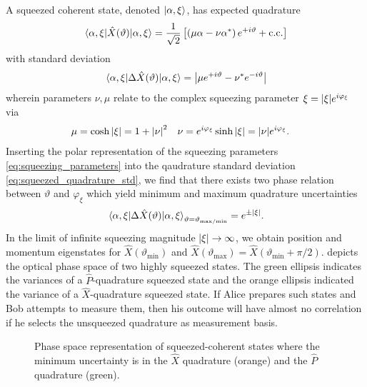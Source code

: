 A squeezed coherent state, denoted $\ket{\alpha,\xi}$, has expected quadrature~\cite[p.~91,94]{Vogel2006}
\begin{equation}
	\expval{\hat{X}(\vartheta)}{\alpha,\xi}
	=
	\frac{1}{\sqrt{2}}
	\left[
		\left(\mu\alpha-\nu\alpha^*\right)
		e^{+i\vartheta}
		+
		\text{c.c.}
	\right]
\end{equation}
with standard deviation~\cite[p.~95]{Vogel2006}
\begin{equation}
	\expval{\Delta\hat{X}(\vartheta)}{\alpha,\xi}
	=
	\abs{\mu e^{+i\vartheta}-\nu^* e^{-i\vartheta}}
	\label{eq:squeezed_quadrature_std}
\end{equation}
wherein parameters $\nu,\mu$ relate to the complex squeezing parameter $\xi=\abs{\xi}e^{i\varphi_\xi}$ via~\cite[p.~90]{Vogel2006}
\begin{align}
	\mu
	&=
	\cosh\abs{\xi}
	=
	1+\abs{\nu}^2
	&
	\nu
	&=
	e^{i\varphi_\xi}
	\sinh\abs{\xi}
	=
	\abs{\nu}
	e^{i\varphi_\xi}
	\label{eq:squeezing_parameters}
	.
\end{align}
Inserting the polar representation of the squeezing parameters \cref{eq:squeezing_parameters} into the qaudrature standard deviation \cref{eq:squeezed_quadrature_std}, we find that there exists two phase relation between $\vartheta$ and $\varphi_\xi$ which yield minimum and maximum quadrature uncertainties~\cite[p.~96]{Vogel2006}
\begin{equation}
	\expval{\Delta\hat{X}(\vartheta)}{\alpha,\xi}_{\vartheta=\vartheta_{\text{max}/\text{min}}}
	=
	e^{\pm\abs{\xi}}
	.
\end{equation}
In the limit of infinite squeezing magnitude $\abs{\xi}\to\infty$, we obtain position and momentum eigenstates for $\hat{X}(\vartheta_\text{min})$ and $\hat{X}(\vartheta_\text{max})=\hat{X}(\vartheta_\text{min}+\pi/2)$.
 depicts the optical phase space of two highly squeezed states.
The green ellipsis indicates the variances of a $\hat{P}$-quadrature squeezed state and the orange ellipsis indicated the variance of a $\hat{X}$-quadrature squeezed state.
If Alice prepares such states and Bob attempts to measure them, then his outcome will have almost no correlation if he selects the unsqueezed quadrature as measurement basis.
\begin{figure}[htb]
	\centering
	
	\caption{Phase space representation of squeezed-coherent states where the minimum uncertainty is in the $\hat{X}$ quadrature (orange) and the $\hat{P}$ quadrature (green).}\label{fig:phase_space_squeezed}
\end{figure}
